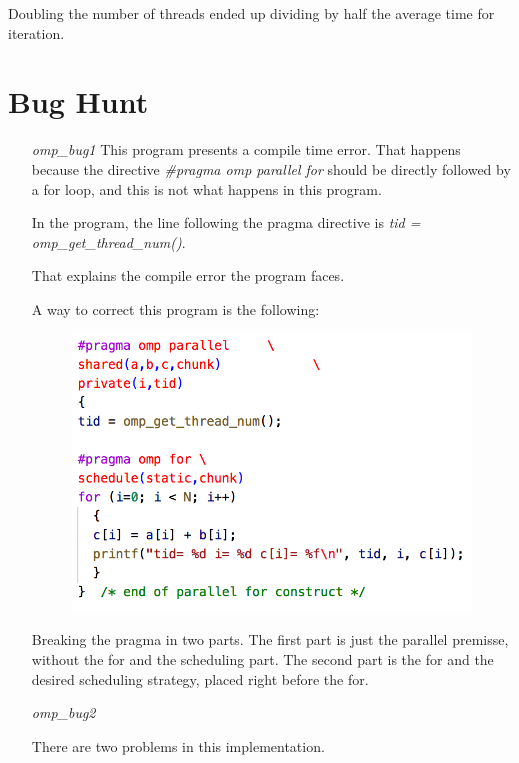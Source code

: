\documentclass[unicode,11pt,a4paper,oneside,numbers=endperiod,openany]{scrartcl}
\begin{document}
        Doubling the number of threads ended up dividing by half the average time for iteration.


\section{Bug Hunt }

\begin{itemize}
    \item[\textit{omp\_bug1}]
        This program presents a compile time error.
        That happens because the directive \textit{\#pragma omp parallel for} should be directly followed by a for loop, and this is not what happens in this program.

        In the program, the line following the pragma directive is \textit{tid = omp\_get\_thread\_num()}.

        That explains the compile error the program faces.

        A way to correct this program is the following:

        \begin{figure}[H]
            \centering
            \includegraphics[width=0.9\linewidth]{bug1}
        \end{figure}

        Breaking the pragma in two parts. 
        The first part is just the parallel premisse, without the for and the scheduling part.
        The second part is the for and the desired scheduling strategy, placed right before the for.

    \item[\textit{omp\_bug2}]

        There are two problems in this implementation.


\end{itemize}
\end{document}
